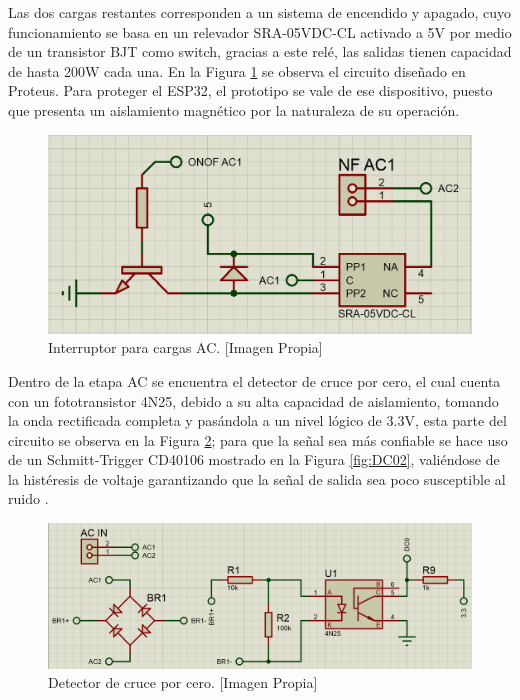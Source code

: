 		Las dos cargas restantes corresponden a un sistema de encendido y apagado, cuyo funcionamiento se basa en un relevador SRA-05VDC-CL activado a 5V por medio de un transistor BJT como switch, gracias a este relé, las salidas tienen capacidad de hasta 200W cada una. En la Figura \ref{fig:ONOFAC} se observa el circuito diseñado en Proteus. Para proteger el ESP32, el prototipo se vale de ese dispositivo, puesto que presenta un aislamiento magnético por la naturaleza de su operación.\\
	
		\begin{figure}[H]
			\centering
			\caption[Interruptor para cargas AC.]{Interruptor para cargas AC.  [Imagen Propia]}
			\label{fig:ONOFAC}
			\includegraphics[width=0.7\linewidth]{Imagenes/ONOFAC}
		\end{figure}
	
		Dentro de la etapa AC se encuentra el detector de cruce por cero, el cual cuenta con un fototransistor 4N25, debido a su alta capacidad de aislamiento, tomando la onda rectificada completa y pasándola a un nivel lógico de 3.3V, esta parte del circuito se observa en la Figura \ref{fig:DC01}; para que la señal sea más confiable se hace uso de un Schmitt-Trigger CD40106 mostrado en la Figura \ref{fig:DC02}, valiéndose de la histéresis de voltaje garantizando que la señal de salida sea poco susceptible al ruido \cite{DC0}.\\
		
		\begin{figure}[H]
			\centering
			\caption[Detector de cruce por cero.]{Detector de cruce por cero.  [Imagen Propia]}
			\label{fig:DC01}
			\includegraphics[width=0.85\linewidth]{Imagenes/DC01}
		\end{figure}
	
